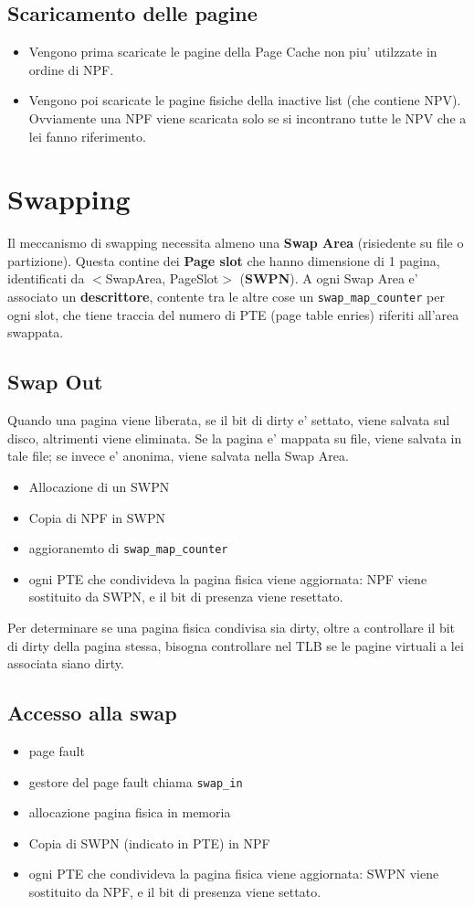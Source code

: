 \documentclass[12pt, a4paper]{report}
\begin{document}
\subsection{Scaricamento delle pagine}
\begin{itemize}
	\item Vengono prima scaricate le pagine della Page Cache non piu' utilzzate
		in ordine di NPF.
	\item Vengono poi scaricate le pagine fisiche della inactive list (che
		contiene NPV). Ovviamente una NPF viene scaricata solo se si incontrano
		tutte le NPV che a lei fanno riferimento.
\end{itemize}

\section{Swapping}
Il meccanismo di swapping necessita almeno una \textbf{Swap Area} (risiedente su
file o partizione). Questa contine dei \textbf{Page slot} che hanno dimensione
di 1 pagina, identificati da $<$SwapArea, PageSlot$>$ (\textbf{SWPN}). A ogni
Swap Area e' associato un \textbf{descrittore}, contente tra le altre cose un
\texttt{swap\_map\_counter} per ogni slot, che tiene traccia del numero di PTE
(page table enries) riferiti all'area swappata.
\subsection{Swap Out}
Quando una pagina viene liberata, se il bit di dirty e' settato, viene salvata
sul disco, altrimenti viene eliminata. Se la pagina e' mappata su file, viene
salvata in tale file; se invece e' anonima, viene salvata nella Swap Area.
\begin{itemize}
	\item Allocazione di un SWPN
	\item Copia di NPF in SWPN
	\item aggioranemto di \texttt{swap\_map\_counter}
	\item ogni PTE che condivideva la pagina fisica viene aggiornata:
		NPF viene sostituito da SWPN, e il bit di presenza viene
		resettato.
\end{itemize}
Per determinare se una pagina fisica condivisa sia dirty, oltre a controllare il
bit di dirty della pagina stessa, bisogna controllare nel TLB se le pagine
virtuali a lei associata siano dirty. %
\subsection{Accesso alla swap}
\begin{itemize}
	\item page fault
	\item gestore del page fault chiama \texttt{swap\_in}
	\item allocazione pagina fisica in memoria
	\item Copia di SWPN (indicato in PTE) in NPF
	\item ogni PTE che condivideva la pagina fisica viene aggiornata: SWPN viene
		sostituito da NPF, e il bit di presenza viene settato.
\end{itemize}
\end{document}
